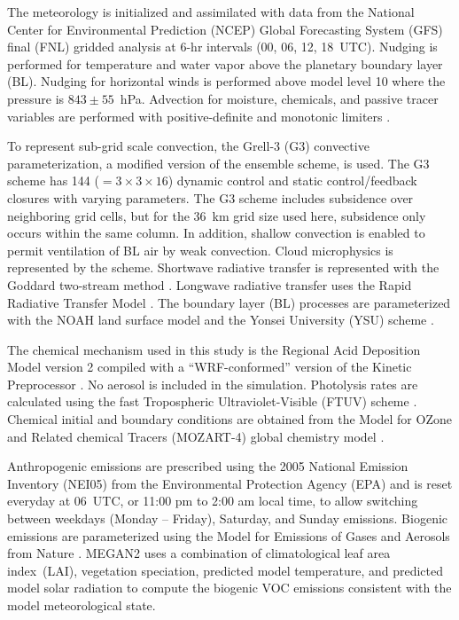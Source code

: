 The meteorology is initialized and assimilated with data from the National Center for Environmental
Prediction (NCEP) Global Forecasting System (GFS) final (FNL) gridded analysis at 6-hr intervals
(00, 06, 12, 18~UTC). Nudging is performed for temperature and water vapor above the planetary
boundary layer (BL). Nudging for horizontal winds is performed above model level 10 where the
pressure is $843\pm55$~hPa. Advection for moisture, chemicals, and passive tracer
variables are performed with positive-definite and monotonic limiters
\citep{Skamarock:2006wm, Wang:2009fk}.

To represent sub-grid scale convection, the Grell-3 (G3) convective parameterization, a modified version of the
\citet{Grell:2002bs} ensemble scheme, is used. The G3 scheme has 144 ($=3\times3\times16$) dynamic control and
static control/feedback closures with varying parameters. The G3 scheme includes subsidence over neighboring grid
cells, but for the 36~km grid size used here, subsidence only occurs within the same column. In addition, shallow convection is
enabled to permit ventilation of BL air by weak convection.
Cloud microphysics is represented by the \citet{Thompson:2008vn}
scheme. Shortwave
radiative transfer is represented with the Goddard two-stream method \citep{Chou:1998kx}.
Longwave radiative transfer uses the
Rapid Radiative Transfer Model \citep[RRTM;][]{Mlawer:1997vn}. The boundary layer (BL)
processes are parameterized with the NOAH land surface model \citep{Chen:2001ys} and the
Yonsei University (YSU) scheme \citep{Hong:2006fk}.

The chemical mechanism used in this study is the Regional Acid Deposition Model version 2
\citep[RADM2;][]{Stockwell:1990ez} compiled with a ``WRF-conformed'' version of the Kinetic
Preprocessor \citep[KPP;][]{Sandu:2006jl}. No aerosol is included in the simulation. Photolysis
rates are calculated using the fast Tropospheric Ultraviolet-Visible (FTUV) scheme \citep{Tie:2003ve}.
Chemical initial and boundary conditions are obtained from the Model for OZone and Related
chemical Tracers (MOZART-4) global chemistry model \citep{Emmons:2010fk}.

Anthropogenic emissions are prescribed using the 2005 National Emission Inventory (NEI05) from the
Environmental Protection Agency (EPA) and is reset everyday at 06~UTC, or 11:00 pm to 2:00 am
local time, to allow switching between weekdays (Monday -- Friday), Saturday, and Sunday
emissions. Biogenic emissions are parameterized using the Model for Emissions of Gases and Aerosols
from Nature \citep[MEGAN2;][]{Guenther:2006kl}. MEGAN2 uses a combination of climatological leaf area
index~(LAI), vegetation speciation, predicted model temperature, and predicted model solar radiation
to compute the biogenic VOC emissions consistent with the model meteorological state.

